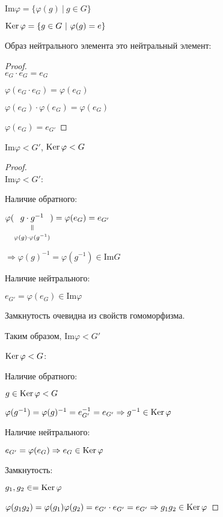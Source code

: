\begin{conj}
  $\mathrm{Im}{\varphi} = \{ \varphi(g)\ |\ g\in G \}$

  $\operatorname{Ker}{\varphi} = \{ g \in G\ |\ \varphi(g) = e \}$
\end{conj}

\begin{theorem-non}
  Образ нейтрального элемента это нейтральный элемент:

  \begin{proof} \; \\
    $e_G \cdot e_G = e_G$

    $\varphi(e_G \cdot e_G) = \varphi(e_G)$

    $\varphi(e_G) \cdot \varphi(e_G) = \varphi(e_G)$

    $\varphi(e_G) = e_{G'}$
  \end{proof}
\end{theorem-non}

\begin{theorem-non}
  $\mathrm{Im}{\varphi} < G'$, $\operatorname{Ker}{\varphi} < G$
  \begin{proof} \; \\
    $\mathrm{Im}{\varphi} < G'$:
    
    Наличие обратного:

    $\varphi(\equalto{g \cdot g^{-1}}{\varphi(g)\cdot \varphi(g^{-1})}) = \varphi(e_G) = e_{G'}$
    
    $\Longrightarrow \varphi(g)^{-1} = \varphi(g^{-1}) \in \mathrm{Im}{G}$

    Наличие нейтрального:

    $e_{G'} = \varphi(e_G) \in \mathrm{Im}{\varphi}$

    Замкнутость очевидна из свойств гомоморфизма. 

    Таким образом, $\mathrm{Im}{\varphi} < G'$
    
    $\operatorname{Ker}{\varphi} < G$:
    
    Наличие обратного:
    
    $g \in \operatorname{Ker}{\varphi} < G$
    
    $\varphi(g^{-1}) = \varphi(g)^{-1} = e_{G'}^{-1} = e_{G'} \Rightarrow g^{-1} \in \operatorname{Ker}{\varphi}$
    
    Наличие нейтрального:
    
    $e_{G'} = \varphi(e_G) \Rightarrow e_G \in \operatorname{Ker}{\varphi}$

    Замкнутость:
    
    $g_1, g_2 \in =\operatorname{Ker}{\varphi}$
    
    $\varphi(g_1 g_2) = \varphi(g_1) \varphi(g_2) = e_{G'} \cdot e_{G'} = e_{G'} \Rightarrow g_1 g_2 \in \operatorname{Ker}{\varphi}$
  \end{proof}
\end{theorem-non}

